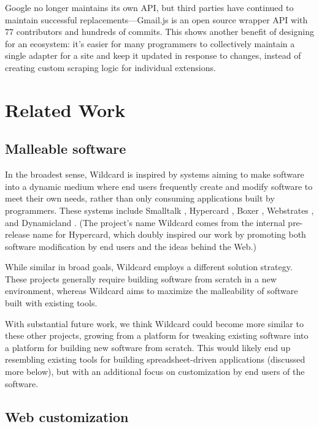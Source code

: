 \documentclass[english,submission]{programming}
\begin{document}
Google no longer maintains its own API, but third parties have continued
to maintain successful replacements---Gmail.js \autocite{talwar2019} is
an open source wrapper API with 77 contributors and hundreds of commits.
This shows another benefit of designing for an ecosystem: it's easier
for many programmers to collectively maintain a single adapter for a
site and keep it updated in response to changes, instead of creating
custom scraping logic for individual extensions.

\hypertarget{sec:related-work}{%
\section{Related Work}\label{sec:related-work}}

\hypertarget{malleable-software}{%
\subsection{Malleable software}\label{malleable-software}}

In the broadest sense, Wildcard is inspired by systems aiming to make
software into a dynamic medium where end users frequently create and
modify software to meet their own needs, rather than only consuming
applications built by programmers. These systems include Smalltalk
\autocite{kay1977}, Hypercard \autocite{hypercard2019} , Boxer
\autocite{disessa1986}, Webstrates \autocite{klokmose2015}, and
Dynamicland \autocite{victor}. (The project's name Wildcard comes from
the internal pre-release name for Hypercard, which doubly inspired our
work by promoting both software modification by end users and the ideas
behind the Web.)

While similar in broad goals, Wildcard employs a different solution
strategy. These projects generally require building software from
scratch in a new environment, whereas Wildcard aims to maximize the
malleability of software built with existing tools.

With substantial future work, we think Wildcard could become more
similar to these other projects, growing from a platform for tweaking
existing software into a platform for building new software from
scratch. This would likely end up resembling existing tools for building
spreadsheet-driven applications (discussed more below), but with an
additional focus on customization by end users of the software.

\hypertarget{web-customization}{%
\subsection{Web customization}\label{web-customization}}
\end{document}

